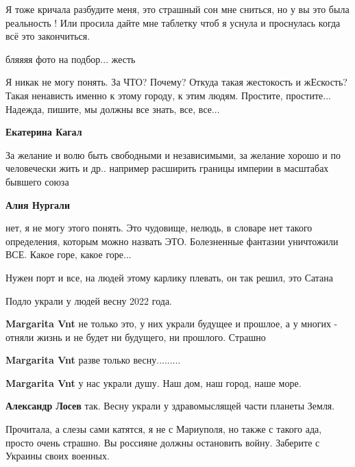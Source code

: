 \begin{itemize}

Я тоже кричала разбудите меня, это страшный сон мне сниться, но у вы это была
реальность ! Или просила дайте мне таблетку чтоб я уснула и проснулась когда
всё это закончиться.

бляяяя фото на подбор... жесть


Я никак не могу понять. За ЧТО? Почему? Откуда такая жестокость и жЕскость?
Такая ненависть именно к этому городу, к этим людям. Простите, простите...
Надежда, пишите, мы должны все знать, все, все...

\begin{itemize} %
\textbf{Екатерина Кагал}

За желание и волю быть свободными и независимыми, за желание хорошо и по
человечески жить и др.. например расширить границы империи в масштабах бывшего
союза

\textbf{Алия Нургали} 

нет, я не могу этого понять. Это чудовище, нелюдь, в словаре нет такого
определения, которым можно назвать ЭТО. Болезненные фантазии уничтожили ВСЕ.
Какое горе, какое горе...


Нужен порт и все, на людей этому карлику плевать, он так решил, это Сатана
\end{itemize} %

Подло украли у людей весну 2022 года.

\begin{itemize} %
\textbf{Margarita Vnt} не только это, у них украли будущее и прошлое, а у многих - отняли жизнь и не будет ни будущего, ни прошлого.
Страшно

\textbf{Margarita Vnt} разве только весну.........

\textbf{Margarita Vnt} у нас украли душу. Наш дом, наш город, наше море.

\textbf{Александр Лосев} так. Весну украли у здравомыслящей части планеты Земля.
\end{itemize} %


Прочитала, а слезы сами катятся, я не с Мариуполя, но также с такого ада,
просто очень страшно. Вы россияне должны остановить войну. Заберите с Украины
своих военных.


\end{itemize}
